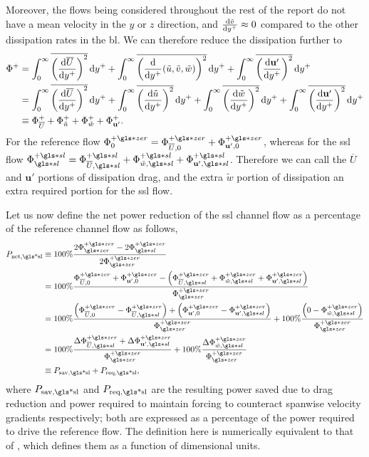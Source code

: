 Moreover, the flows being considered throughout the rest of the report do not have a mean velocity in the $y$ or $z$ direction, and $\dv{\tilde{v}}{y^{+}} \approx0$ compared to the other dissipation rates in the \gls{bl}. We can therefore reduce the dissipation further to 
\begin{align}
	\Phi ^{+} &=\int_{0}^{\infty}  \overline{\left( \dv{\overline{U}}{y\ensuremath{^{+}}}  \right) ^2}\dd{y\ensuremath{^{+}}}+\int_{0}^{\infty}  \overline{\left( \dv{y\ensuremath{^{+}}}(\tilde{u},\tilde{v},\tilde{w})  \right) ^2} \dd{y\ensuremath{^{+}}} + \int_{0}^{\infty}  \overline{\left(\dv{\mathbf{u'} }{y\ensuremath{^{+}}}\right) ^2} \dd{y\ensuremath{^{+}}}\\
	&=\int_{0}^{\infty}  \overline{\left( \dv{\overline{U}}{y\ensuremath{^{+}}}  \right) ^2}\dd{y\ensuremath{^{+}}}+\int_{0}^{\infty}  \overline{\left( \dv{\tilde{u}}{y\ensuremath{^{+}}}  \right) ^2} \dd{y\ensuremath{^{+}}} +\int_{0}^{\infty}  \overline{\left( \dv{\tilde{w}}{y\ensuremath{^{+}}}  \right) ^2} \dd{y\ensuremath{^{+}}} + \int_{0}^{\infty}  \overline{\left(\dv{\mathbf{u'} }{y\ensuremath{^{+}}}\right) ^2} \dd{y\ensuremath{^{+}}}\\
	&\equiv \Phi_{\overline{U}}^{+} + \Phi _{\tilde{u}}^{+} + \Phi _{\tilde{w}}^{+} + \Phi _{\mathbf{u'} }^{+}
.\end{align}
For the reference flow $\Phi _{0}\pz=\Phi _{\overline{U},0}\pz+\Phi _{\mathbf{u'} ,0}\pz$, whereas for the \gls{ssl} flow $\Phi \ssl\ps=\Phi _{\overline{U},\gls*{sl}}\ps + \Phi _{\tilde{w},\gls*{sl}}\ps + \Phi _{\mathbf{u'},\gls*{sl} }\ps$. Therefore we can call the $\overline{U}$ and $\mathbf{u'} $ portions of dissipation drag, and the extra $\tilde{w}$ portion of dissipation an extra required portion for the \gls{ssl} flow.

Let us now define the net power reduction of the \gls{ssl} channel flow as a percentage of the reference channel flow as follows,
\begin{align}
	P_\text{net,\gls*{sl}} &\equiv 100\% \frac{ 2\Phi \zz\pz-2\Phi \ssl\pz }{2\Phi \zz\pz} \\
			       &= 100\% \frac{\Phi _{\overline{U},0}\pz+\Phi _{\mathbf{u'} ,0}\pz-\left(\Phi _{\overline{U},\gls*{sl}}\pz + \Phi _{\tilde{w},\gls*{sl}}\pz + \Phi _{\mathbf{u'},\gls*{sl} }\pz\right)}{\Phi \zz\pz} \\
			       &= 100\% \frac{\left(\Phi _{\overline{U},0}\pz-\Phi _{\overline{U},\gls*{sl}}\pz\right)+\left(\Phi _{\mathbf{u'} ,0}\pz - \Phi _{\mathbf{u'},\gls*{sl} }\pz\right)}{\Phi \zz\pz}+100\%\frac{\left(0- \Phi _{\tilde{w},\gls*{sl}}\pz\right) }{\Phi \zz\pz} \\
			       &= 100\% \frac{\Delta\Phi _{\overline{U},\gls*{sl}}\pz+\Delta \Phi _{\mathbf{u'},\gls*{sl} }\pz}{\Phi \zz\pz}+100\%\frac{ \Delta\Phi _{\tilde{w},\gls*{sl}}\pz }{\Phi \zz\pz} \\
			       &\equiv P_\text{sav,\gls*{sl}} +  P_\text{req,\gls*{sl}} \label{eq:psavpreqsl}
,\end{align}
where $P_\text{sav,\gls*{sl}} $ and $P_\text{req,\gls*{sl}} $ are the resulting power saved due to drag reduction and power required to maintain forcing to counteract spanwise velocity gradients respectively; both are expressed as a percentage of the power required to drive the reference flow. The definition here is numerically equivalent to that of \textcite{viotti2009}, which defines them as a function of dimensional units.

